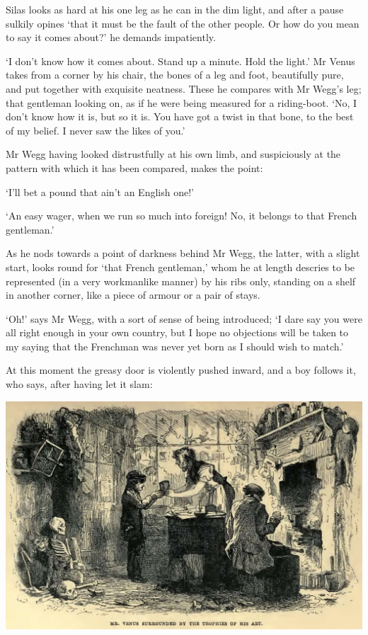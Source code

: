 Silas looks as hard at his one leg as he can in the dim light, and after
a pause sulkily opines ‘that it must be the fault of the other people.
Or how do you mean to say it comes about?’ he demands impatiently.

‘I don’t know how it comes about. Stand up a minute. Hold the light.’
Mr Venus takes from a corner by his chair, the bones of a leg and foot,
beautifully pure, and put together with exquisite neatness. These he
compares with Mr Wegg’s leg; that gentleman looking on, as if he were
being measured for a riding-boot. ‘No, I don’t know how it is, but so it
is. You have got a twist in that bone, to the best of my belief. I never
saw the likes of you.’

Mr Wegg having looked distrustfully at his own limb, and suspiciously at
the pattern with which it has been compared, makes the point:

‘I’ll bet a pound that ain’t an English one!’

‘An easy wager, when we run so much into foreign! No, it belongs to that
French gentleman.’

As he nods towards a point of darkness behind Mr Wegg, the latter, with
a slight start, looks round for ‘that French gentleman,’ whom he at
length descries to be represented (in a very workmanlike manner) by his
ribs only, standing on a shelf in another corner, like a piece of armour
or a pair of stays.

‘Oh!’ says Mr Wegg, with a sort of sense of being introduced; ‘I
dare say you were all right enough in your own country, but I hope no
objections will be taken to my saying that the Frenchman was never yet
born as I should wish to match.’

At this moment the greasy door is violently pushed inward, and a boy
follows it, who says, after having let it slam:

\includegraphics[scale=2.3]{01-07-01}

